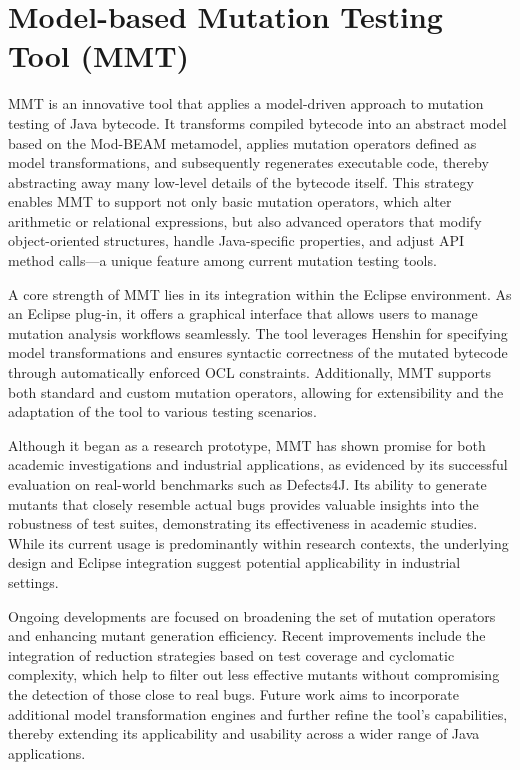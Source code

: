 \documentclass[sigplan, nonacm]{acmart}
\begin{document}
\section{Model-based Mutation Testing Tool (MMT)}

MMT is an innovative tool that applies a model-driven approach to mutation testing of Java bytecode. It transforms compiled bytecode into an abstract model based on the Mod-BEAM metamodel, applies mutation operators defined as model transformations, and subsequently regenerates executable code, thereby abstracting away many low-level details of the bytecode itself. This strategy enables MMT to support not only basic mutation operators, which alter arithmetic or relational expressions, but also advanced operators that modify object-oriented structures, handle Java-specific properties, and adjust API method calls—a unique feature among current mutation testing tools.

A core strength of MMT lies in its integration within the Eclipse environment. As an Eclipse plug-in, it offers a graphical interface that allows users to manage mutation analysis workflows seamlessly. The tool leverages Henshin for specifying model transformations and ensures syntactic correctness of the mutated bytecode through automatically enforced OCL constraints. Additionally, MMT supports both standard and custom mutation operators, allowing for extensibility and the adaptation of the tool to various testing scenarios.

Although it began as a research prototype, MMT has shown promise for both academic investigations and industrial applications, as evidenced by its successful evaluation on real-world benchmarks such as Defects4J. Its ability to generate mutants that closely resemble actual bugs provides valuable insights into the robustness of test suites, demonstrating its effectiveness in academic studies. While its current usage is predominantly within research contexts, the underlying design and Eclipse integration suggest potential applicability in industrial settings.

Ongoing developments are focused on broadening the set of mutation operators and enhancing mutant generation efficiency. Recent improvements include the integration of reduction strategies based on test coverage and cyclomatic complexity, which help to filter out less effective mutants without compromising the detection of those close to real bugs. Future work aims to incorporate additional model transformation engines and further refine the tool’s capabilities, thereby extending its applicability and usability across a wider range of Java applications.
\end{document}
